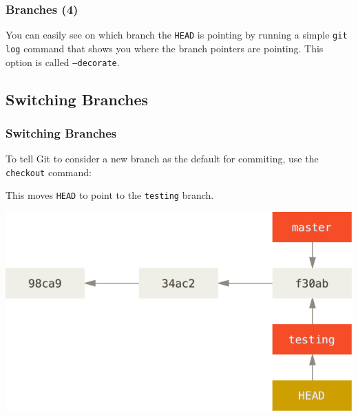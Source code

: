 \begin{frame}
  \frametitle{Branches (4)}

   You can easily see on which branch the \texttt{HEAD} is pointing by running a simple \texttt{git log} command that shows you where the branch pointers are pointing. This option is called \texttt{--decorate}.

  \gitdecorate
\end{frame}




\subsection{Switching Branches}
\begin{frame}
  \frametitle{Switching Branches}

  To tell Git to consider a new branch as the default for commiting, use the
  \texttt{checkout} command:

  \gitnine

This moves \texttt{HEAD} to point to the \texttt{testing} branch.

\begin{center}
    \includegraphics[width=0.7\linewidth]{figures/head-to-testing}
  \end{center}

\end{frame}


